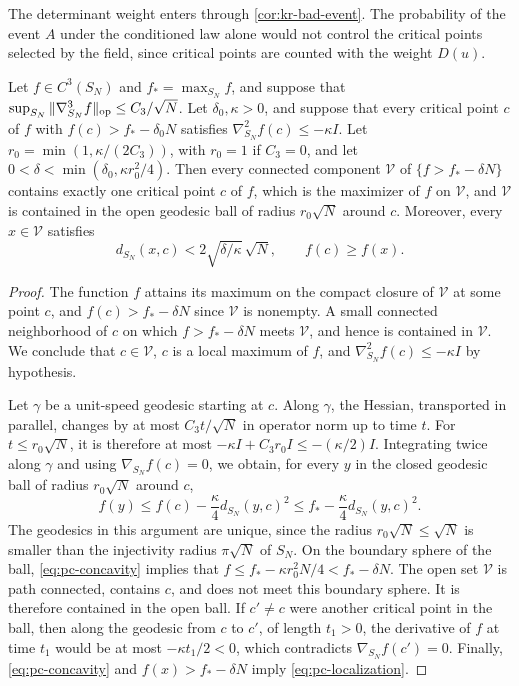 The determinant weight enters through \cref{cor:kr-bad-event}. The probability of the event $A$ under the conditioned law alone would not control the critical points selected by the field, since critical points are counted with the weight $D(u)$.

\begin{lemma}\label{lem:pc-superlevel}
Let $f\in C^3(S_N)$ and $f_*=\max_{S_N}f$, and suppose that $\sup_{S_N}\|\nabla^3_{S_N}f\|_{\rm op}\le C_3/\sqrt N$. Let $\delta_0,\kappa>0$, and suppose that every critical point $c$ of $f$ with $f(c)>f_*-\delta_0N$ satisfies $\nabla^2_{S_N}f(c)\le-\kappa I$. Let $r_0=\min(1,\kappa/(2C_3))$, with $r_0=1$ if $C_3=0$, and let $0<\delta<\min(\delta_0,\kappa r_0^2/4)$. Then every connected component $\mathcal V$ of $\{f>f_*-\delta N\}$ contains exactly one critical point $c$ of $f$, which is the maximizer of $f$ on $\mathcal V$, and $\mathcal V$ is contained in the open geodesic ball of radius $r_0\sqrt N$ around $c$. Moreover, every $x\in\mathcal V$ satisfies
\begin{equation}\label{eq:pc-localization}
d_{S_N}(x,c)<2\sqrt{\delta/\kappa}\,\sqrt N,\qquad f(c)\ge f(x).
\end{equation}
\end{lemma}

\begin{proof}
The function $f$ attains its maximum on the compact closure of $\mathcal V$ at some point $c$, and $f(c)>f_*-\delta N$ since $\mathcal V$ is nonempty. A small connected neighborhood of $c$ on which $f>f_*-\delta N$ meets $\mathcal V$, and hence is contained in $\mathcal V$. We conclude that $c\in\mathcal V$, $c$ is a local maximum of $f$, and $\nabla^2_{S_N}f(c)\le-\kappa I$ by hypothesis.

Let $\gamma$ be a unit-speed geodesic starting at $c$. Along $\gamma$, the Hessian, transported in parallel, changes by at most $C_3t/\sqrt N$ in operator norm up to time $t$. For $t\le r_0\sqrt N$, it is therefore at most $-\kappa I+C_3r_0I\le-(\kappa/2)I$. Integrating twice along $\gamma$ and using $\nabla_{S_N}f(c)=0$, we obtain, for every $y$ in the closed geodesic ball of radius $r_0\sqrt N$ around $c$,
\begin{equation}\label{eq:pc-concavity}
f(y)\le f(c)-\frac\kappa4d_{S_N}(y,c)^2\le f_*-\frac\kappa4d_{S_N}(y,c)^2.
\end{equation}
The geodesics in this argument are unique, since the radius $r_0\sqrt N\le\sqrt N$ is smaller than the injectivity radius $\pi\sqrt N$ of $S_N$. On the boundary sphere of the ball, \eqref{eq:pc-concavity} implies that $f\le f_*-\kappa r_0^2N/4<f_*-\delta N$. The open set $\mathcal V$ is path connected, contains $c$, and does not meet this boundary sphere. It is therefore contained in the open ball. If $c'\ne c$ were another critical point in the ball, then along the geodesic from $c$ to $c'$, of length $t_1>0$, the derivative of $f$ at time $t_1$ would be at most $-\kappa t_1/2<0$, which contradicts $\nabla_{S_N}f(c')=0$. Finally, \eqref{eq:pc-concavity} and $f(x)>f_*-\delta N$ imply \eqref{eq:pc-localization}.
\end{proof}

